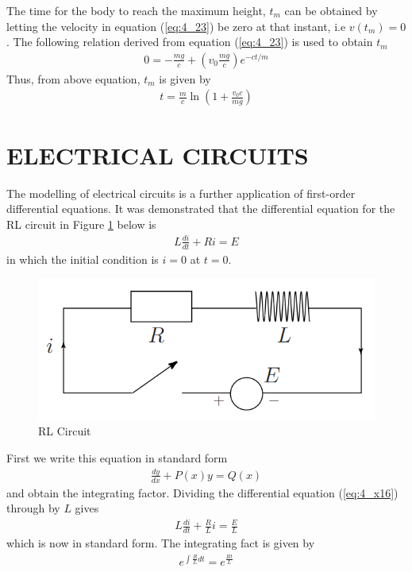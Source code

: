 \documentclass[11pt]{report}
\newcommand{\refn}[1]{(\ref{#1})}
\newcommand{\refx}[1]{\refn{eq:#1}}
\newcommand{\NI}{\noindent}
\begin{document}
	\NI The time for the body to reach the maximum height, $t_m$ can be obtained by letting the velocity in equation \refx{4_23} be zero at that instant, i.e $v(t_m)=0$. The following relation derived from equation \refx{4_23} is used to obtain $t_m$
	\begin{eqnarray*}
		0 = -\frac{mg}{c}+\left(v_0\frac{mg}{c}\right)e^{-ct/m}
	\end{eqnarray*}
	Thus, from above equation, $t_m$ is given by
	\begin{eqnarray}
		t = \frac{m}{c}\ln\left(1 + \frac{v_0 c}{mg}\right)
	\end{eqnarray}


	\section{ELECTRICAL CIRCUITS}
	The modelling of electrical circuits is a further application of first-order differential equations. It was demonstrated that the differential equation for the RL circuit in Figure \ref{fig:4_3} below is
	\begin{eqnarray}
		L\frac{di}{dt} + Ri = E\label{eq:4_x16}
	\end{eqnarray}
	in which the initial condition is $i=0$ at $t=0$.
	\begin{figure}[!h]
		\centering
		\includegraphics[width=.9\linewidth]{circuit}
		\caption{RL Circuit}\label{fig:4_3}
	\end{figure}
	First we write this equation in standard form 
	\begin{eqnarray}
		\frac{dy}{dx} + P(x)y = Q(x)
	\end{eqnarray}
	and obtain the integrating factor. Dividing the differential equation \refx{4_x16} through by $L$ gives
	\begin{eqnarray}
		L\frac{di}{dt} + \frac{R}{L}i = \frac{E}{L}\label{eq:4_x18}
	\end{eqnarray}
	which is now in standard form. The integrating fact is given by
	\begin{eqnarray}
		e^{\int\frac{R}{L}dt} = e^{\frac{Rt}{L}}
	\end{eqnarray}
\end{document}

